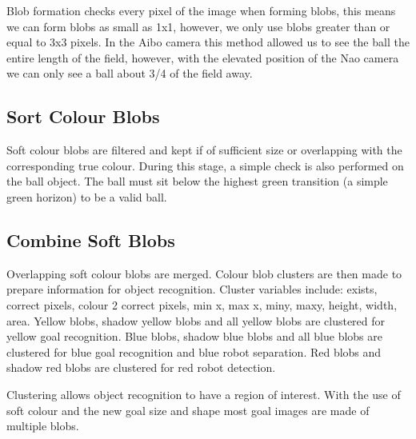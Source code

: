 Blob formation checks every pixel of the image when forming blobs, this means we can form blobs as small as 1x1, however, we only use blobs greater than or equal to 3x3 pixels. In the Aibo camera this method allowed us to see the ball the entire length of the field, however, with the elevated position of the Nao camera we can only see a ball about 3/4 of the field away.

\subsection{Sort Colour Blobs}

Soft colour blobs are filtered and kept if of sufficient size or overlapping with the corresponding true colour. During this stage, a simple check is also performed on the ball object. The ball must sit below the highest green transition (a simple green horizon) to be a valid ball.

\subsection{Combine Soft Blobs}

Overlapping soft colour blobs are merged. Colour blob clusters are then made to prepare information for object recognition. Cluster variables include: exists, correct pixels, colour 2 correct pixels, min x, max x, miny, maxy, height, width, area. 
Yellow blobs, shadow yellow blobs and all yellow blobs are clustered for yellow goal recognition. Blue blobs, shadow blue blobs and all blue blobs are clustered for blue goal recognition and blue robot separation. Red blobs and shadow red blobs are clustered for red robot detection.

Clustering allows object recognition to have a region of interest. With the use of soft colour and the new goal size and shape most goal images are made of multiple blobs.